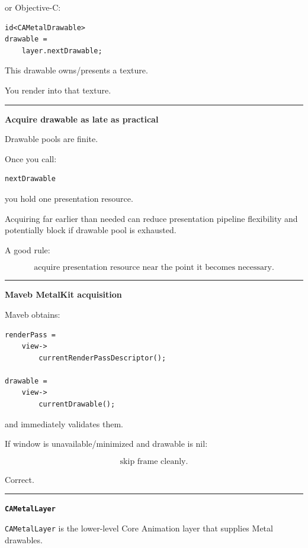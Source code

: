 or Objective-C:

\begin{verbatim}
id<CAMetalDrawable>
drawable =
    layer.nextDrawable;
\end{verbatim}

This drawable owns/presents a texture.

You render into that texture.

\begin{center}\rule{0.5\linewidth}{0.5pt}\end{center}

\textbf{Acquire drawable as late as practical}

Drawable pools are finite.

Once you call:

\begin{verbatim}
nextDrawable
\end{verbatim}

you hold one presentation resource.

Acquiring far earlier than needed can reduce presentation pipeline flexibility and potentially block if drawable pool is exhausted.

A good rule:

\[
\boxed{
\text{acquire presentation resource near the point it becomes necessary}.
}
\]

\begin{center}\rule{0.5\linewidth}{0.5pt}\end{center}

\textbf{Maveb MetalKit acquisition}

Maveb obtains:

\begin{verbatim}
renderPass =
    view->
        currentRenderPassDescriptor();

drawable =
    view->
        currentDrawable();
\end{verbatim}

and immediately validates them.

If window is unavailable/minimized and drawable is nil:

\[
\boxed{
\text{skip frame cleanly}.
}
\]

Correct.

\begin{center}\rule{0.5\linewidth}{0.5pt}\end{center}

\textbf{\texttt{CAMetalLayer}}

\texttt{CAMetalLayer} is the lower-level Core Animation layer that supplies Metal drawables.

